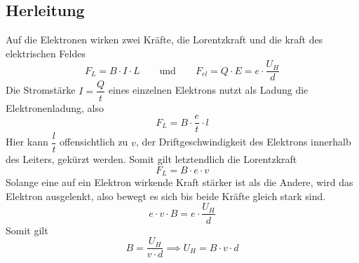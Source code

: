 \documentclass{article}
\begin{document}
\subsection{Herleitung}%
Auf die Elektronen wirken zwei Kräfte, die Lorentzkraft und die kraft des elektrischen Feldes 
\[
 F_L = B \cdot I \cdot L
 \qquad \text{und} \qquad
 F_{el} = Q \cdot E = e \cdot \frac{U_H}{d}
\] 
Die Stromstärke $I = \dfrac{Q}{t}$ eines einzelnen Elektrons nutzt als Ladung die Elektronenladung, also
\[
 F_L = B \cdot \frac{e}{t} \cdot l 
\]
Hier kann $\dfrac{l}{t}$ offensichtlich zu $v$, der Driftgeschwindigkeit des Elektrons innerhalb des Leiters, gekürzt werden. Somit gilt letztendlich die Lorentzkraft
\[
 F_L = B \cdot e \cdot v 
\] 
Solange eine auf ein Elektron wirkende Kraft stärker ist als die Andere, wird das Elektron ausgelenkt, also bewegt es sich bis beide Kräfte gleich stark sind.
\[
 e \cdot v \cdot B = e \cdot \frac{U_H}{d}
\]
Somit gilt
\[
 B = \frac{U_H}{v \cdot d} \implies U_H = B \cdot v \cdot d
\]
\end{document}
